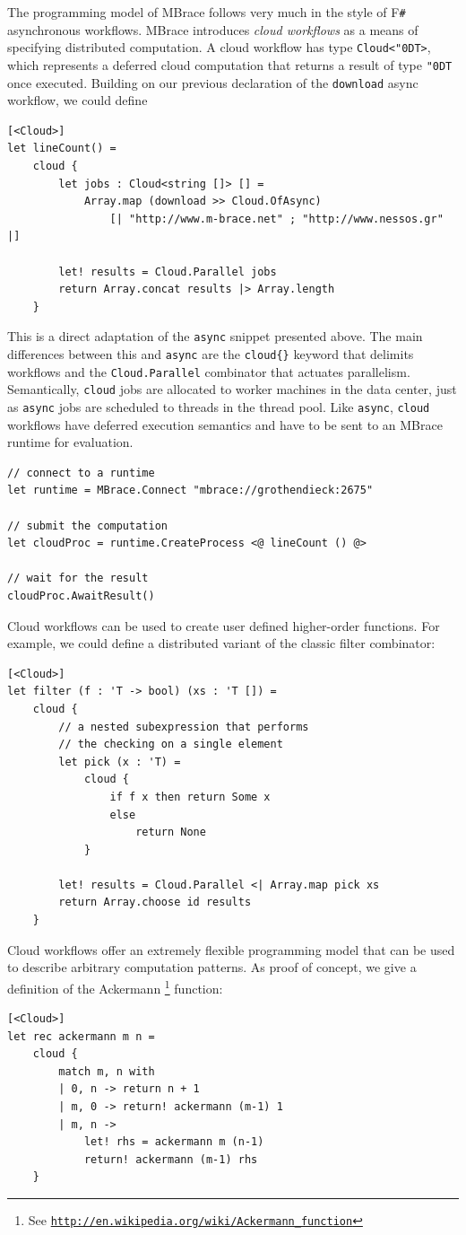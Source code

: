 \documentclass[9pt,a4paper]{article}
\newcommand{\mbrace}{MBrace}
\newcommand{\Mbrace}{MBrace}
\newcommand{\fsharp}{F\texttt \#}
\newcommand{\samehref}[1]{\href{#1}{\texttt{#1}}}
\newcommand{\uq}{\char"0D}
\begin{document}
The programming model of \mbrace{} follows very much in the style of \fsharp{} 
asynchronous workflows. \Mbrace{} introduces \emph{cloud workflows}
as a means of specifying distributed computation.
A cloud workflow has type \texttt{Cloud<\uq{}T>}, which represents a
deferred cloud computation that returns a result of type \texttt{\uq{}T} once executed.
Building on our previous declaration of the \texttt{download} async workflow, we could define
\begin{lstlisting}
[<Cloud>]
let lineCount() = 
	cloud {
    	let jobs : Cloud<string []> [] = 
        	Array.map (download >> Cloud.OfAsync) 
				[| "http://www.m-brace.net" ; "http://www.nessos.gr" |]

	    let! results = Cloud.Parallel jobs
    	return Array.concat results |> Array.length
	}
\end{lstlisting}
This is a direct adaptation of the \texttt{async} snippet presented above.
The main differences between this and \texttt{async} 
are the \texttt{cloud\{\}} keyword that delimits workflows
and the \texttt{Cloud.Parallel} combinator that actuates parallelism.
Semantically, \texttt{cloud} jobs are allocated to worker machines in the data center, 
just as \texttt{async} jobs are scheduled to threads in the thread pool. 
Like \texttt{async}, \texttt{cloud} workflows have deferred execution semantics 
and have to be sent to an \mbrace{} runtime for evaluation.
\begin{lstlisting}
// connect to a runtime
let runtime = MBrace.Connect "mbrace://grothendieck:2675"

// submit the computation
let cloudProc = runtime.CreateProcess <@ lineCount () @>

// wait for the result
cloudProc.AwaitResult()
\end{lstlisting}
%
%
Cloud workflows can be used to create user defined higher-order functions. 
For example, we could define a distributed variant of the classic filter combinator:
\begin{lstlisting}
[<Cloud>]
let filter (f : 'T -> bool) (xs : 'T []) =
    cloud {
		// a nested subexpression that performs
		// the checking on a single element
		let pick (x : 'T) =
			cloud {
				if f x then return Some x
				else
					return None
			}

        let! results = Cloud.Parallel <| Array.map pick xs
		return Array.choose id results
    }
\end{lstlisting}
%
%
Cloud workflows offer an extremely flexible programming model that can
be used to describe arbitrary computation patterns.
As proof of concept, we give a definition of the Ackermann%
\footnote{See \samehref{http://en.wikipedia.org/wiki/Ackermann\_function}} function:
\begin{lstlisting}
[<Cloud>]
let rec ackermann m n =
    cloud {
        match m, n with
        | 0, n -> return n + 1
        | m, 0 -> return! ackermann (m-1) 1
        | m, n ->
            let! rhs = ackermann m (n-1)
            return! ackermann (m-1) rhs
    }
\end{lstlisting}
%
\end{document}
